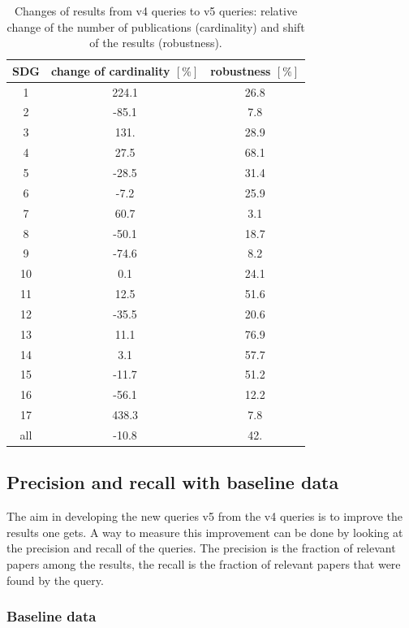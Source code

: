\documentclass{article}
\begin{document}
\begin{table}[H]
\centering 
 \begin{tabular}{ccc}
 \toprule
  SDG & change of cardinality $[\%]$  & robustness $[\%]$ \\
 \hline
 1 & 224.1 & 26.8 \\
 2 & -85.1 & 7.8 \\
 3 & 131. & 28.9 \\
 4 & 27.5 & 68.1 \\
 5 & -28.5 & 31.4 \\
 6 & -7.2 & 25.9 \\
 7 & 60.7 & 3.1 \\
 8 & -50.1 & 18.7 \\
 9 & -74.6 & 8.2 \\
 10 & 0.1 & 24.1 \\
 11 & 12.5 & 51.6 \\
 12 & -35.5 & 20.6 \\
 13 & 11.1 & 76.9 \\
 14 & 3.1 & 57.7 \\
 15 & -11.7 & 51.2 \\
 16 & -56.1 & 12.2 \\
 17 & 438.3 & 7.8 \\
 all & -10.8 & 42. \\
 \bottomrule
\end{tabular}\caption{Changes of results from v4 queries to v5 queries: relative change of the number of publications (cardinality) and shift of the results (robustness).}
\label{robustnesstable}
\end{table}



\subsection{Precision and recall with baseline data}
\label{sec:precision-recall}
The aim in developing the new queries v5 from the v4 queries is to improve the results one gets. A way to measure this improvement can be done by looking at the precision and recall of the queries. The precision is the fraction of relevant papers among the results, the recall is the fraction of relevant papers that were found by the query.

\subsubsection{Baseline data}
 
\end{document}
